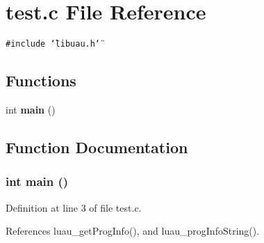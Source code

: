 \section{test.c File Reference}
\label{test_8c}
{\tt \#include \char`\"{}libuau.h\char`\"{}}\par
\subsection*{Functions}
\begin{CompactItemize}
\item 
int {\bf main} ()
\end{CompactItemize}


\subsection{Function Documentation}
\subsubsection{\setlength{\rightskip}{0pt plus 5cm}int main ()}\label{test_8c_a0}




Definition at line 3 of file test.c.

References luau\_\-get\-Prog\-Info(), and luau\_\-prog\-Info\-String().